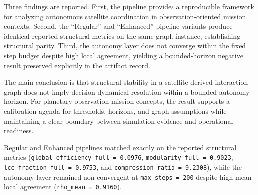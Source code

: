 \documentclass[fleqn,10pt,letterpaper]{article}
\begin{document}
Three findings are reported. First, the pipeline provides a reproducible framework for analyzing autonomous satellite coordination in observation-oriented mission contexts. Second, the “Regular” and “Enhanced” pipeline variants produce identical reported structural metrics on the same graph instance, establishing structural parity. Third, the autonomy layer does not converge within the fixed step budget despite high local agreement, yielding a bounded-horizon negative result preserved explicitly in the artifact record.

The main conclusion is that structural stability in a satellite-derived interaction graph does not imply decision-dynamical resolution within a bounded autonomy horizon. For planetary-observation mission concepts, the result supports a calibration agenda for thresholds, horizons, and graph assumptions while maintaining a clear boundary between simulation evidence and operational readiness.

Regular and Enhanced pipelines matched exactly on the reported structural metrics (\texttt{global\_efficiency\_full = 0.0976}, \texttt{modularity\_full = 0.9023}, \texttt{lcc\_fraction\_full = 0.9753}, and \texttt{compression\_ratio = 9.2308}), while the autonomy layer remained non-convergent at \texttt{max\_steps = 200} despite high mean local agreement (\texttt{rho\_mean = 0.9160}).
\end{document}
